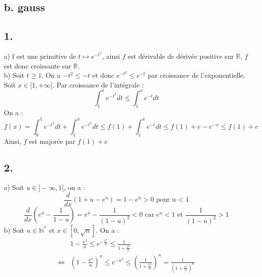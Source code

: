 \documentclass[10pt]{article}
\begin{document}
\pagebreak

\subsection{b. gauss}
\subsection*{1.}
\begin{tcolorbox}[enhanced, width=7in, center, size=fbox, fontupper=\large, drop shadow southwest]
    a) f est une primitive de $t \mapsto e^{-t^2}$, ainsi $f$ est dérivable de dérivée positive sur $\mathbb{R}$, $f$ est donc croissante sur $\mathbb{R}$.\\
    b) Soit $t \geq 1$. On a $-t^2 \leq -t$ et donc $e^{-t^2}\leq e^{-t}$ par croissance de l'exponentielle.\\
    Soit $x\in[1,+\infty[$. Par croissance de l'intégrale :
    \begin{equation*}
        \int_1^{x}{e^{-t^2}dt} \leq \int_1^{x}{e^{-t}dt}
    \end{equation*}
    On a :
    \begin{equation*}
        f(x) = \int_0^1{e^{-t^2}dt}+\int_1^x{e^{-t^2}dt}\leq f(1) + \int_1^x{e^{-t}dt}\leq f(1) + e - e^{-x} \leq f(1) + e
    \end{equation*}
    Ainsi, $f$ est majorée par $f(1)+e$
\end{tcolorbox}

\subsection*{2.}
\begin{tcolorbox}[enhanced, width=7in, center, size=fbox, fontupper=\large, drop shadow southwest]
    a) Soit $u \in ]-\infty, 1[$, on a :
    \begin{equation*}
        \frac{d}{dx}\left( 1+u-e^u \right) = 1 - e^u > 0 \text{ pour u < 1}
    \end{equation*}
    \begin{equation*}
        \frac{d}{dx}\left( e^u - \frac{1}{1-u} \right) = e^u - \frac{1}{(1-u)^2} < 0 \text{ car } e^u < 1 \text{ et } \frac{1}{(1-u)^2} > 1
    \end{equation*}
    b) Soit $n\in\mathbb{N}^*$ et $x\in[0,\sqrt{n}]$. On a :
    \begin{align*}
        &1-\frac{x^2}{n} \leq e^{-\frac{x^2}{n}} \leq \frac{1}{1+\frac{x^2}{n}}\\
        \iff&(1-\frac{x^2}{n})^n \leq e^{-x^2} \leq (\frac{1}{1+\frac{x^2}{n}})^n=\frac{1}{(1+\frac{x^2}{n})^n}
    \end{align*}
\end{tcolorbox}
\end{document}
